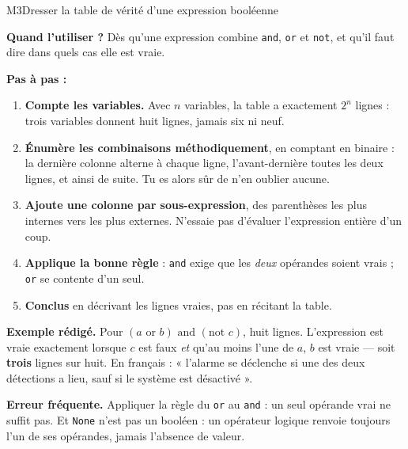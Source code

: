 \begin{fichemethode}{M3}{Dresser la table de vérité d'une expression booléenne}

\textbf{Quand l'utiliser ?} Dès qu'une expression combine \lstinline{and},
\lstinline{or} et \lstinline{not}, et qu'il faut dire dans quels cas elle est vraie.

\textbf{Pas à pas :}
\begin{enumerate}
  \item \textbf{Compte les variables.} Avec $n$ variables, la table a exactement $2^n$ lignes :
        trois variables donnent huit lignes, jamais six ni neuf.
  \item \textbf{Énumère les combinaisons méthodiquement}, en comptant en binaire : la dernière
        colonne alterne à chaque ligne, l'avant-dernière toutes les deux lignes, et ainsi de
        suite. Tu es alors sûr de n'en oublier aucune.
  \item \textbf{Ajoute une colonne par sous-expression}, des parenthèses les plus internes vers
        les plus externes. N'essaie pas d'évaluer l'expression entière d'un coup.
  \item \textbf{Applique la bonne règle} : \lstinline{and} exige que les \emph{deux} opérandes
        soient vrais ; \lstinline{or} se contente d'un seul.
  \item \textbf{Conclus} en décrivant les lignes vraies, pas en récitant la table.
\end{enumerate}

\textbf{Exemple rédigé.} Pour $(a \text{ or } b) \text{ and } (\text{not } c)$, huit lignes.
L'expression est vraie exactement lorsque $c$ est faux \emph{et} qu'au moins l'une de $a$, $b$
est vraie — soit \textbf{trois} lignes sur huit. En français : « l'alarme se déclenche si une
des deux détections a lieu, sauf si le système est désactivé ».

\textbf{Erreur fréquente.} Appliquer la règle du \lstinline{or} au \lstinline{and} : un seul
opérande vrai ne suffit pas. Et \lstinline{None} n'est pas un booléen : un opérateur logique
renvoie toujours l'un de ses opérandes, jamais l'absence de valeur.

\end{fichemethode}
